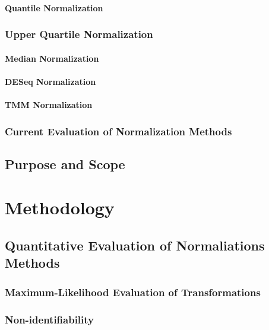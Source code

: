 \documentclass{book}\usepackage[]{graphicx}\usepackage[]{color}
\begin{document}
\subsubsection{Quantile Normalization}

\subsection{Upper Quartile Normalization}

\subsubsection{Median Normalization}

\subsubsection{DESeq Normalization}

\subsubsection{TMM Normalization}



\subsection{Current Evaluation of Normalization Methods}

\section{Purpose and Scope}

\chapter{Methodology}

\section{Quantitative Evaluation of Normaliations Methods}

\subsection{Maximum-Likelihood Evaluation of Transformations}

\subsection{Non-identifiability}
\end{document}
